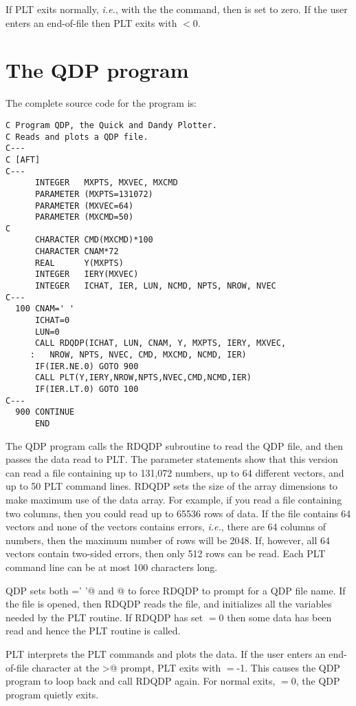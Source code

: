 If PLT exits normally, {\it i.e.}, with the the \verb@EXit@ command,
then \verb@IER@ is set to zero.
If the user enters an end-of-file then PLT exits with \verb@IER@$<$0.

\pagebreak
\section{The QDP program}
The complete source code for the \verb@QDP@ program is:
\medskip
\begin{verbatim}
C Program QDP, the Quick and Dandy Plotter.
C Reads and plots a QDP file.
C---
C [AFT]
C---
      INTEGER   MXPTS, MXVEC, MXCMD
      PARAMETER (MXPTS=131072)
      PARAMETER (MXVEC=64)
      PARAMETER (MXCMD=50)
C
      CHARACTER CMD(MXCMD)*100
      CHARACTER CNAM*72
      REAL      Y(MXPTS)
      INTEGER   IERY(MXVEC)
      INTEGER   ICHAT, IER, LUN, NCMD, NPTS, NROW, NVEC
C---
  100 CNAM=' '
      ICHAT=0
      LUN=0
      CALL RDQDP(ICHAT, LUN, CNAM, Y, MXPTS, IERY, MXVEC,
     :   NROW, NPTS, NVEC, CMD, MXCMD, NCMD, IER)
      IF(IER.NE.0) GOTO 900
      CALL PLT(Y,IERY,NROW,NPTS,NVEC,CMD,NCMD,IER)
      IF(IER.LT.0) GOTO 100
C---
  900 CONTINUE
      END
\end{verbatim}
\medskip

The QDP program calls the RDQDP subroutine to read the QDP file,
and then passes the data read to PLT.
The parameter statements show that this version can read a file
containing up to 131,072 numbers,
up to 64 different vectors, and up to 50 PLT command lines.
RDQDP sets the size of the array dimensions to make maximum use of the
data array.
For example, if you read a file containing two columns, then you
could read up to 65536 rows of data.
If the file contains 64 vectors and none of the vectors contains errors,
{\it i.e.}, there are 64 columns of numbers,
then the maximum number of rows will be 2048.
If, however, all 64 vectors contain two-sided errors,
then only 512 rows can be read.
Each PLT command line can be at most 100 characters long.

QDP sets both \verb@CNAM=' '@ and @ to force RDQDP to prompt
for a QDP file name.
If the file is opened, then RDQDP reads the file, and
initializes all the variables needed by the PLT routine.
If RDQDP has set \verb@IER@$=$0 then some data has been read and hence the
PLT routine is called.

PLT interprets the PLT commands and plots the data.
If the user enters an end-of-file character at the \verb@PLT>@ prompt,
PLT exits with \verb@IER@$=$-1.
This causes the QDP program to loop back and call RDQDP again.
For normal exits, \verb@IER@$=$0, the QDP program quietly exits.

